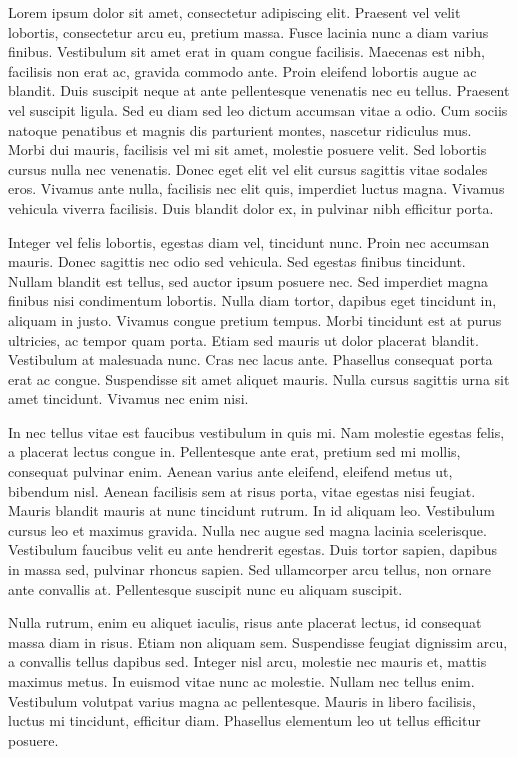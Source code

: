 
Lorem ipsum dolor sit amet, consectetur adipiscing elit. Praesent vel velit lobortis, consectetur arcu eu, pretium massa. Fusce lacinia nunc a diam varius finibus. Vestibulum sit amet erat in quam congue facilisis. Maecenas est nibh, facilisis non erat ac, gravida commodo ante. Proin eleifend lobortis augue ac blandit. Duis suscipit neque at ante pellentesque venenatis nec eu tellus. Praesent vel suscipit ligula. Sed eu diam sed leo dictum accumsan vitae a odio. Cum sociis natoque penatibus et magnis dis parturient montes, nascetur ridiculus mus. Morbi dui mauris, facilisis vel mi sit amet, molestie posuere velit. Sed lobortis cursus nulla nec venenatis. Donec eget elit vel elit cursus sagittis vitae sodales eros. Vivamus ante nulla, facilisis nec elit quis, imperdiet luctus magna. Vivamus vehicula viverra facilisis. Duis blandit dolor ex, in pulvinar nibh efficitur porta.

Integer vel felis lobortis, egestas diam vel, tincidunt nunc. Proin nec accumsan mauris. Donec sagittis nec odio sed vehicula. Sed egestas finibus tincidunt. Nullam blandit est tellus, sed auctor ipsum posuere nec. Sed imperdiet magna finibus nisi condimentum lobortis. Nulla diam tortor, dapibus eget tincidunt in, aliquam in justo. Vivamus congue pretium tempus. Morbi tincidunt est at purus ultricies, ac tempor quam porta. Etiam sed mauris ut dolor placerat blandit. Vestibulum at malesuada nunc. Cras nec lacus ante. Phasellus consequat porta erat ac congue. Suspendisse sit amet aliquet mauris. Nulla cursus sagittis urna sit amet tincidunt. Vivamus nec enim nisi.

In nec tellus vitae est faucibus vestibulum in quis mi. Nam molestie egestas felis, a placerat lectus congue in. Pellentesque ante erat, pretium sed mi mollis, consequat pulvinar enim. Aenean varius ante eleifend, eleifend metus ut, bibendum nisl. Aenean facilisis sem at risus porta, vitae egestas nisi feugiat. Mauris blandit mauris at nunc tincidunt rutrum. In id aliquam leo. Vestibulum cursus leo et maximus gravida. Nulla nec augue sed magna lacinia scelerisque. Vestibulum faucibus velit eu ante hendrerit egestas. Duis tortor sapien, dapibus in massa sed, pulvinar rhoncus sapien. Sed ullamcorper arcu tellus, non ornare ante convallis at. Pellentesque suscipit nunc eu aliquam suscipit.

Nulla rutrum, enim eu aliquet iaculis, risus ante placerat lectus, id consequat massa diam in risus. Etiam non aliquam sem. Suspendisse feugiat dignissim arcu, a convallis tellus dapibus sed. Integer nisl arcu, molestie nec mauris et, mattis maximus metus. In euismod vitae nunc ac molestie. Nullam nec tellus enim. Vestibulum volutpat varius magna ac pellentesque. Mauris in libero facilisis, luctus mi tincidunt, efficitur diam. Phasellus elementum leo ut tellus efficitur posuere.


